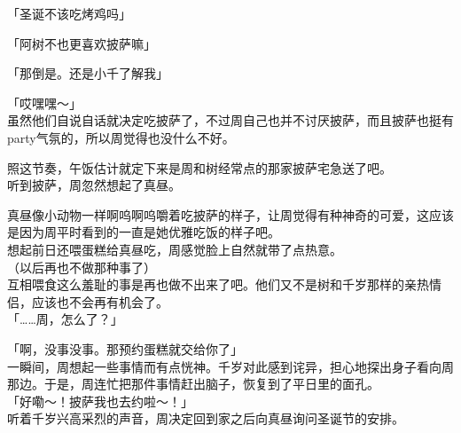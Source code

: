 「圣诞不该吃烤鸡吗」

「阿树不也更喜欢披萨嘛」

「那倒是。还是小千了解我」

「哎嘿嘿～」\\

虽然他们自说自话就决定吃披萨了，不过周自己也并不讨厌披萨，而且披萨也挺有party气氛的，所以周觉得也没什么不好。

照这节奏，午饭估计就定下来是周和树经常点的那家披萨宅急送了吧。\\

听到披萨，周忽然想起了真昼。

真昼像小动物一样啊呜啊呜嚼着吃披萨的样子，让周觉得有种神奇的可爱，这应该是因为周平时看到的一直是她优雅吃饭的样子吧。\\

想起前日还喂蛋糕给真昼吃，周感觉脸上自然就带了点热意。\\

（以后再也不做那种事了）\\

互相喂食这么羞耻的事是再也做不出来了吧。他们又不是树和千岁那样的亲热情侣，应该也不会再有机会了。\\

「……周，怎么了？」

「啊，没事没事。那预约蛋糕就交给你了」\\

一瞬间，周想起一些事情而有点恍神。千岁对此感到诧异，担心地探出身子看向周那边。于是，周连忙把那件事情赶出脑子，恢复到了平日里的面孔。\\

「好嘞～！披萨我也去约啦～！」\\

听着千岁兴高采烈的声音，周决定回到家之后向真昼询问圣诞节的安排。
